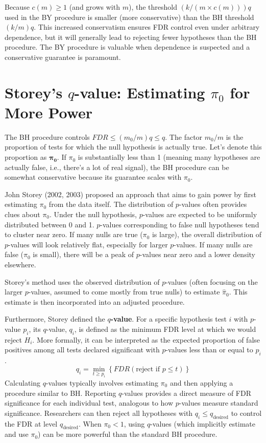\documentclass[12pt]{book}
\newcommand{\FDR}{{FDR}}    %
\newcommand{\pvalue}{$p$-value}          %
\newcommand{\qvalue}{$q$-value}          %
\begin{document}
Because $c(m) \ge 1$ (and grows with $m$), the threshold $(k / (m \times c(m))) q$ used in the BY procedure is smaller (more conservative) than the BH threshold $(k/m)q$. This increased conservatism ensures FDR control even under arbitrary dependence, but it will generally lead to rejecting fewer hypotheses than the BH procedure. The BY procedure is valuable when dependence is suspected and a conservative guarantee is paramount.

\section{Storey's \texorpdfstring{$q$}{q}-value: Estimating \texorpdfstring{$\pi_0$}{pi0} for More Power}
The BH procedure controls $\FDR \le (m_0/m) q \le q$. The factor $m_0/m$ is the proportion of tests for which the null hypothesis is actually true. Let's denote this proportion as $\boldsymbol{\pi_0}$. If $\pi_0$ is substantially less than 1 (meaning many hypotheses are actually false, i.e., there's a lot of real signal), the BH procedure can be somewhat conservative because its guarantee scales with $\pi_0$.

John Storey (2002, 2003) proposed an approach that aims to gain power by first estimating $\pi_0$ from the data itself. The distribution of \pvalue s often provides clues about $\pi_0$. Under the null hypothesis, \pvalue s are expected to be uniformly distributed between 0 and 1. \pvalue s corresponding to false null hypotheses tend to cluster near zero. If many nulls are true ($\pi_0$ is large), the overall distribution of \pvalue s will look relatively flat, especially for larger \pvalue s. If many nulls are false ($\pi_0$ is small), there will be a peak of \pvalue s near zero and a lower density elsewhere.

Storey's method uses the observed distribution of \pvalue s (often focusing on the larger \pvalue s, assumed to come mostly from true nulls) to estimate $\hat{\pi}_0$. This estimate is then incorporated into an adjusted procedure.

Furthermore, Storey defined the \textbf{\qvalue}. For a specific hypothesis test $i$ with \pvalue{} $p_i$, its \qvalue{}, $q_i$, is defined as the minimum FDR level at which we would reject $H_i$. More formally, it can be interpreted as the expected proportion of false positives among all tests declared significant with \pvalue s less than or equal to $p_i$.
\begin{equation}
    q_i = \min_{t \ge p_i} \left\{ \FDR(\text{reject if } p \le t) \right\}
\end{equation}
Calculating \qvalue s typically involves estimating $\pi_0$ and then applying a procedure similar to BH. Reporting \qvalue s provides a direct measure of FDR significance for each individual test, analogous to how \pvalue s measure standard significance. Researchers can then reject all hypotheses with $q_i \le q_{\text{desired}}$ to control the FDR at level $q_{\text{desired}}$. When $\pi_0 < 1$, using \qvalue s (which implicitly estimate and use $\pi_0$) can be more powerful than the standard BH procedure.
\end{document}
